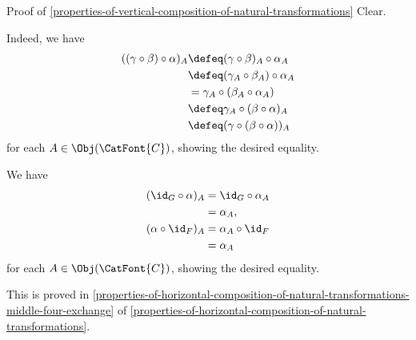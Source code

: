 \begin{Proof}{Proof of \cref{properties-of-vertical-composition-of-natural-transformations}}%
    Clear.

    Indeed, we have
    \begin{align*}
        ((\gamma\circ\beta)\circ\alpha)_{A} &\defeq (\gamma\circ\beta)_{A}\circ\alpha_{A}\\
                                            &\defeq (\gamma_{A}\circ\beta_{A})\circ\alpha_{A}\\
                                            &=      \gamma_{A}\circ(\beta_{A}\circ\alpha_{A})\\
                                            &\defeq \gamma_{A}\circ(\beta\circ\alpha)_{A}\\
                                            &\defeq (\gamma\circ(\beta\circ\alpha))_{A}
    \end{align*}
    for each $A\in\Obj(\CatFont{C})$, showing the desired equality.

    We have
    \begin{align*}
        (\id_{G}\circ\alpha)_{A} &= \id_{G}\circ\alpha_{A}\\
                                 &= \alpha_{A},\\
        (\alpha\circ\id_{F})_{A} &= \alpha_{A}\circ\id_{F}\\
                                 &= \alpha_{A}
    \end{align*}
    for each $A\in\Obj(\CatFont{C})$, showing the desired equality.

    This is proved in \cref{properties-of-horizontal-composition-of-natural-transformations-middle-four-exchange} of \cref{properties-of-horizontal-composition-of-natural-transformations}.
\end{Proof}
